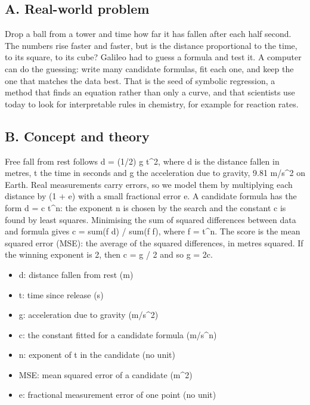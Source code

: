 \documentclass[11pt,a4paper]{article}
\begin{document}
\subsection*{A. Real-world problem}
Drop a ball from a tower and time how far it has fallen after each half second. The numbers rise faster and faster, but is the distance proportional to the time, to its square, to its cube? Galileo had to guess a formula and test it. A computer can do the guessing: write many candidate formulas, fit each one, and keep the one that matches the data best. That is the seed of symbolic regression, a method that finds an equation rather than only a curve, and that scientists use today to look for interpretable rules in chemistry, for example for reaction rates.

\subsection*{B. Concept and theory}
Free fall from rest follows d = (1/2) g t\textasciicircum{}2, where d is the distance fallen in metres, t the time in seconds and g the acceleration due to gravity, 9.81 m/s\textasciicircum{}2 on Earth. Real measurements carry errors, so we model them by multiplying each distance by (1 + e) with a small fractional error e. A candidate formula has the form d = c t\textasciicircum{}n: the exponent n is chosen by the search and the constant c is found by least squares. Minimising the sum of squared differences between data and formula gives c = sum(f d) / sum(f f), where f = t\textasciicircum{}n. The score is the mean squared error (MSE): the average of the squared differences, in metres squared. If the winning exponent is 2, then c = g / 2 and so g = 2c.

\begin{itemize}[nosep]
\item d: distance fallen from rest (m)
\item t: time since release (s)
\item g: acceleration due to gravity (m/s\textasciicircum{}2)
\item c: the constant fitted for a candidate formula (m/s\textasciicircum{}n)
\item n: exponent of t in the candidate (no unit)
\item MSE: mean squared error of a candidate (m\textasciicircum{}2)
\item e: fractional measurement error of one point (no unit)
\end{itemize}
\end{document}
